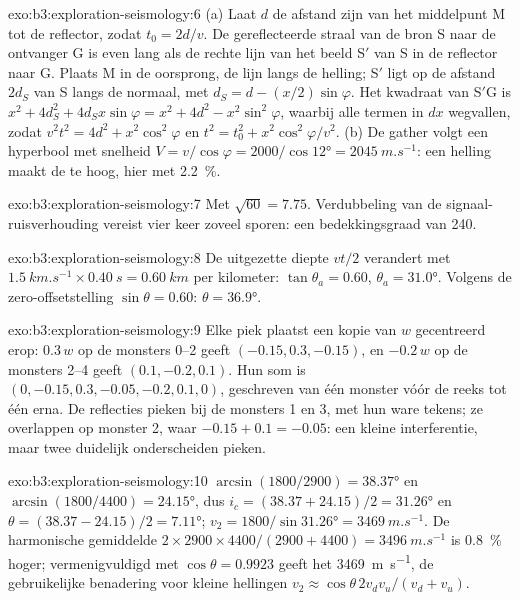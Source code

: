 \begin{solution}{exo:b3:exploration-seismology:6}
(a) Laat $d$ de afstand zijn van het middelpunt M tot de reflector, zodat
$t_0 = 2d/v$. De gereflecteerde straal van de bron S naar de ontvanger G is even lang
als de rechte lijn van het beeld S$'$ van S in de reflector naar G. Plaats M in
de oorsprong, de lijn langs de helling; S$'$ ligt op de afstand $2d_S$ van S langs
de normaal, met $d_S = d - (x/2)\sin\varphi$. Het kwadraat van S$'$G is
$x^2 + 4d_S^2 + 4d_Sx\sin\varphi = x^2 + 4d^2 - x^2\sin^2\varphi$, waarbij alle termen
in $dx$ wegvallen, zodat $v^2t^2 = 4d^2 + x^2\cos^2\varphi$ en
$t^2 = t_0^2 + x^2\cos^2\varphi/v^2$. (b) De gather volgt een hyperbool met snelheid
$V = v/\cos\varphi = 2000/\cos\ang{12} = \qty{2045}{m.s^{-1}}$: een helling maakt de
 te hoog, hier met \qty{2.2}{\percent}.
\end{solution}

\begin{solution}{exo:b3:exploration-seismology:7}
Met $\sqrt{60} = 7.75$. Verdubbeling van de signaal-ruisverhouding vereist vier keer zoveel
sporen: een bedekkingsgraad van 240.
\end{solution}

\begin{solution}{exo:b3:exploration-seismology:8}
De uitgezette diepte $vt/2$ verandert met $\qty{1.5}{km.s^{-1}}\times\qty{0.40}{s}
= \qty{0.60}{km}$ per kilometer: $\tan\theta_a = 0.60$, $\theta_a = \ang{31.0}$.
Volgens de zero-offsetstelling $\sin\theta = 0.60$: $\theta = \ang{36.9}$.
\end{solution}

\begin{solution}{exo:b3:exploration-seismology:9}
Elke piek plaatst een kopie van $w$ gecentreerd erop: $0.3\,w$ op de monsters 0--2 geeft
$(-0.15, 0.3, -0.15)$, en $-0.2\,w$ op de monsters 2--4 geeft $(0.1, -0.2, 0.1)$.
Hun som is $(0, -0.15, 0.3, -0.05, -0.2, 0.1, 0)$, geschreven van één monster
vóór de reeks tot één erna. De reflecties pieken bij de monsters 1 en 3, met
hun ware tekens; ze overlappen op monster 2, waar $-0.15 + 0.1 = -0.05$: een
kleine interferentie, maar twee duidelijk onderscheiden pieken.
\end{solution}

\begin{solution}{exo:b3:exploration-seismology:10}
$\arcsin(1800/2900) = \ang{38.37}$ en $\arcsin(1800/4400) = \ang{24.15}$, dus
$i_c = (38.37 + 24.15)/2 = \ang{31.26}$ en $\theta = (38.37 - 24.15)/2 =
\ang{7.11}$; $v_2 = 1800/\sin\ang{31.26} = \qty{3469}{m.s^{-1}}$. De harmonische
gemiddelde $2\times2900\times4400/(2900 + 4400) = \qty{3496}{m.s^{-1}}$ is
\qty{0.8}{\percent} hoger; vermenigvuldigd met $\cos\theta = 0.9923$ geeft het
\qty{3469}{m.s^{-1}}, de gebruikelijke benadering voor kleine hellingen
$v_2 \approx \cos\theta\,2v_dv_u/(v_d + v_u)$.
\end{solution}


